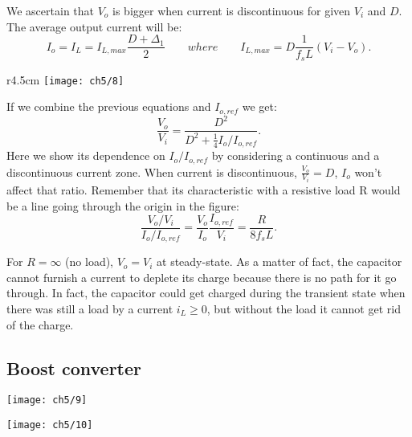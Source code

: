 			We ascertain that $V_o$ is bigger when current is discontinuous for given $V_i$ and $D$. The average output current will be:
			\begin{equation}
				I_o = I_L = I_{L,max}\frac{D+\Delta _1}{2}\qquad where \qquad I_{L,max} = D\frac{1}{f_sL}(V_i-V_o).
			\end{equation}
			
			\begin{wrapfigure}[8]{r}{4.5cm}
			\vspace{-5mm}
			\texttt{[image: ch5/8]}
			\end{wrapfigure}
			If we combine the previous equations and $I_{o,ref}$ we get:
			\begin{equation}
				\frac{V_o}{V_i} = \frac{D^2}{D^2+\frac{1}{4}I_o/I_{o,ref}}.
			\end{equation}
			Here we show its dependence on $I_o/I_{o,ref}$ by considering a continuous and a discontinuous current zone. When current is discontinuous, $\frac{V_o}{V_i} = D$, $I_o$ won't affect that ratio. Remember that its characteristic with a resistive load R would be a line going through the origin in the figure:
			\begin{equation}
				\frac{V_o/V_i}{I_o/I_{o,ref}} = \frac{V_o}{I_o}\frac{I_{o,ref}}{V_i} = \frac{R}{8 f_s L}.
			\end{equation}
			
			For $R=\infty$ (no load), $V_o = V_i$ at steady-state. As a matter of fact, the capacitor cannot furnish a current to deplete its charge because there is no path for it go through. In fact, the capacitor could get charged during the transient state when there was still a load by a current $i_L\geq  0$, but without the load it cannot get rid of the charge. 
			
	\subsection{Boost converter}
		\begin{center}
		\begin{minipage}{0.45\textwidth}
			\texttt{[image: ch5/9]}
		\end{minipage}
		\begin{minipage}{0.45\textwidth}
			\texttt{[image: ch5/10]}
		\end{minipage}
		\end{center}
		
